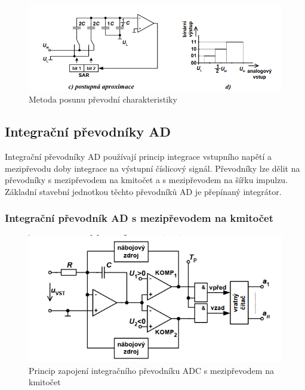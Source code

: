 \begin{figure}[h]
   \begin{center}
     \includegraphics[scale=0.6]{images/ADprox4.png}
   \end{center}
   \caption{Metoda posunu převodní charakteristiky}
\end{figure}

\newpage
\subsection{Integrační převodníky AD}
Integrační převodníky AD používají princip integrace vstupního napětí a mezipřevodu doby integrace na výstupní číslicový signál. Převodníky lze dělit na převodníky s mezipřevodem na kmitočet a s mezipřevodem na šířku impulzu. Základní stavební jednotkou těchto převodníků AD je přepínaný integrátor.

\subsubsection{Integrační převodník AD s mezipřevodem na kmitočet}
\begin{figure}[h]
   \begin{center}
     \includegraphics[scale=0.6]{images/ADint.png}
   \end{center}
   \caption{Princip zapojení integračního převodníku ADC s mezipřevodem na kmitočet}
\end{figure}

